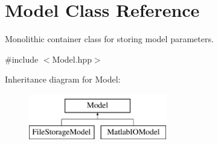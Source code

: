 \hypertarget{classModel}{\section{\-Model \-Class \-Reference}
\label{classModel}
}


\-Monolithic container class for storing model parameters.  




{\ttfamily \#include $<$\-Model.\-hpp$>$}

\-Inheritance diagram for \-Model\-:\begin{figure}[H]
\begin{center}
\leavevmode
\includegraphics[height=2.000000cm]{classModel}
\end{center}
\end{figure}

